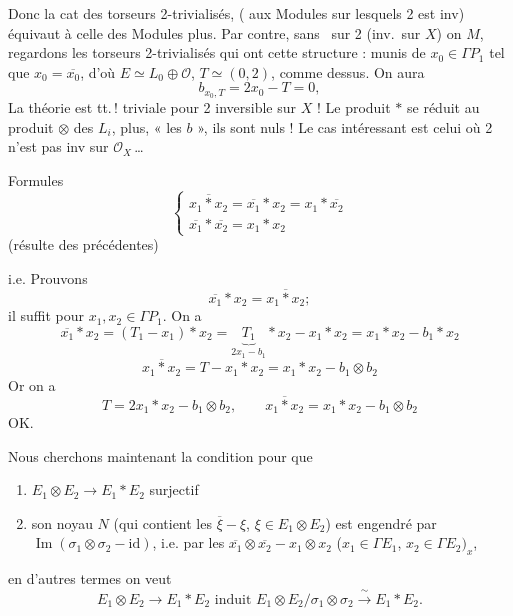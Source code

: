 \documentclass[11pt,a4paper]{article}
\begin{document}

Donc la cat des \ill{}torseurs 2-trivialisés, ( aux Modules sur lesquels 2 est inv) équivaut à celle des Modules  plus. Par contre, sans \ sur 2 (inv.\ sur $X$) on \ill{} $M$, regardons les  torseurs 2-trivialisés qui ont cette structure : munis de  $x_0 \in \Gamma P_1$ tel que $x_0 = \overline{x_0}$, d'où $E \simeq L_0 \oplus \mathcal{O}$, $T \simeq (0,2)$, comme dessus. On aura
\[
  b_{x_0,T} = 2x_0 - T = 0 ,
\]
La théorie est tt.\,! triviale pour 2 inversible sur $X$ ! Le produit $*$ se réduit au produit $\otimes$ des $L_i$,  plus, « les $b$  », ils sont nuls !  Le cas intéressant est celui où 2 n'est \struck{\ill{}} pas inv sur $\mathcal{O}_X$\,…

Formules
\[
  \begin{cases}
    \overline{x_1 * x_2} = \overline{x_1} * x_2 = x_1 * \overline{x_2} \\
    \overline{x_1} * \overline{x_2} = x_1 * x_2
  \end{cases}
\]
(résulte des précédentes)

i.e. Prouvons
\[
  \overline{x_1} * x_2 = \overline{x_1 * x_2} ;
\]
il suffit pour $x_1, x_2 \in \Gamma P_1$. On a
\[
  \overline{x_1} * x_2 = (T_1 - x_1) * x_2 = \underbrace{T_1}_{2x_1 - b_1} * x_2 - x_1 * x_2 = x_1 * x_2 - b_1 * x_2
\]
\[
  \overline{x_1 * x_2} = T - x_1 * x_2 = x_1 * x_2 - b_1 \otimes b_2
\]
Or on a
\[
  T = 2x_1 * x_2 - b_1 \otimes b_2 ,
  \qquad
  \overline{x_1 * x_2} = x_1 * x_2 - b_1 \otimes b_2
\]
OK.

 Nous cherchons maintenant la condition pour que
\begin{enumerate}
  \item[a)] $E_1 \otimes E_2 \to E_1 * E_2$ surjectif
  \item[b)] son noyau $N$ (qui contient les $\overline{\xi} - \xi$, $\xi \in E_1 \otimes E_2$) est engendré par  $\operatorname{Im}(\sigma_1 \otimes \sigma_2 - \mathrm{id})$, i.e. par les $\overline{x_1} \otimes \overline{x_2} - x_1 \otimes x_2$ ($x_1 \in \Gamma E_1$, $x_2 \in \Gamma E_2)_x$,
\end{enumerate}
 en d'autres termes on veut
\[
  E_1 \otimes E_2 \to E_1 * E_2 \text{ induit } E_1 \otimes E_2 / \sigma_1 \otimes \sigma_2 \xrightarrow{\ \sim\ } E_1 * E_2 .
\]
\end{document}

